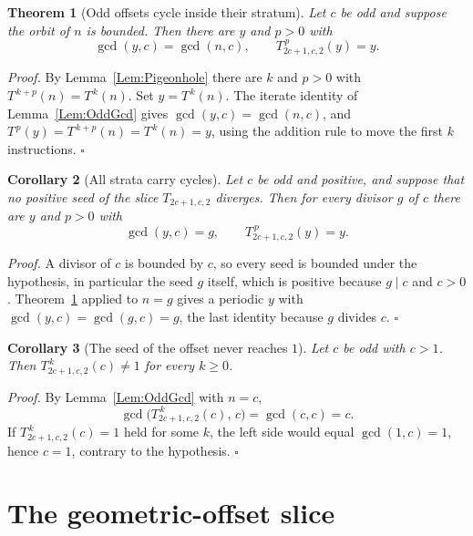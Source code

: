 \documentclass[11pt,letterpaper]{article}
\newtheorem{theorem}{Theorem}
\newtheorem{corollary}[theorem]{Corollary}
\newenvironment{proof}{\noindent\textit{Proof.}}{\hfill\(\square\)}
\begin{document}
\begin{theorem}[Odd offsets cycle inside their stratum]\label{Thm:StratumCycle}
Let \(c\) be odd and suppose the orbit of \(n\) is bounded. Then there are
\(y\) and \(p>0\) with
\[
 \gcd(y,c)=\gcd(n,c),\qquad T_{2c+1,c,2}^{\,p}(y)=y .
\]
\end{theorem}

\begin{proof}
By Lemma~\ref{Lem:Pigeonhole} there are \(k\) and \(p>0\) with
\(T^{\,k+p}(n)=T^{\,k}(n)\). Set \(y=T^{\,k}(n)\). The iterate identity of
Lemma~\ref{Lem:OddGcd} gives \(\gcd(y,c)=\gcd(n,c)\), and
\(T^{\,p}(y)=T^{\,k+p}(n)=T^{\,k}(n)=y\), using the addition rule to move the
first \(k\) instructions.
\end{proof}

\begin{corollary}[All strata carry cycles]\label{Cor:ManyCycles}
Let \(c\) be odd and positive, and suppose that no positive seed of the slice
\(T_{2c+1,c,2}\) diverges. Then for every divisor \(g\) of \(c\) there are
\(y\) and \(p>0\) with
\[
 \gcd(y,c)=g,\qquad T_{2c+1,c,2}^{\,p}(y)=y .
\]
\end{corollary}

\begin{proof}
A divisor of \(c\) is bounded by \(c\), so every seed is bounded under the
hypothesis, in particular the seed \(g\) itself, which is positive because
\(g\mid c\) and \(c>0\). Theorem~\ref{Thm:StratumCycle} applied to \(n=g\)
gives a periodic \(y\) with \(\gcd(y,c)=\gcd(g,c)=g\), the last identity
because \(g\) divides \(c\).
\end{proof}

\begin{corollary}[The seed of the offset never reaches \(1\)]\label{Cor:NoSeedCapture}
Let \(c\) be odd with \(c>1\). Then \(T_{2c+1,c,2}^{\,k}(c)\ne1\) for every
\(k\ge0\).
\end{corollary}

\begin{proof}
By Lemma~\ref{Lem:OddGcd} with \(n=c\),
\[
 \gcd\bigl(T_{2c+1,c,2}^{\,k}(c),\,c\bigr)=\gcd(c,c)=c .
\]
If \(T_{2c+1,c,2}^{\,k}(c)=1\) held for some \(k\), the left side would equal
\(\gcd(1,c)=1\), hence \(c=1\), contrary to the hypothesis.
\end{proof}

\section{The geometric-offset slice}
\end{document}
